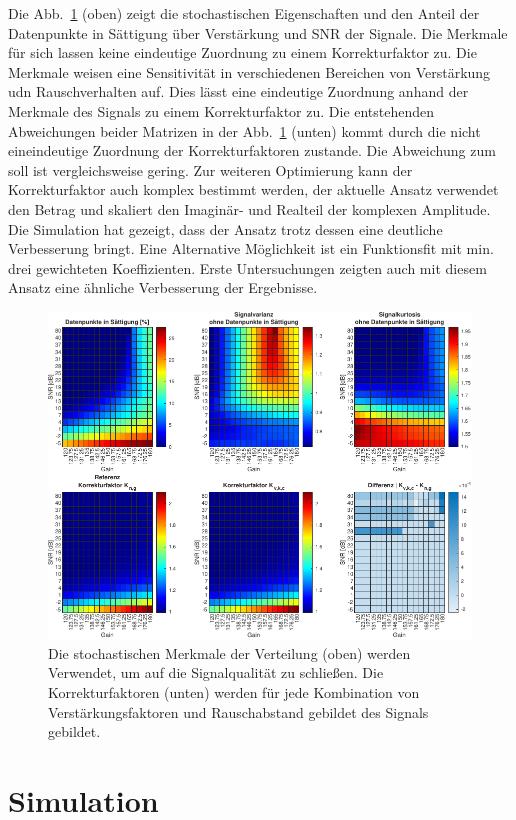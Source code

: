 Die Abb.~\ref{fig:lut} (oben) zeigt die stochastischen Eigenschaften und den Anteil der Datenpunkte in Sättigung über Verstärkung und SNR der Signale. Die Merkmale für sich lassen keine eindeutige Zuordnung zu einem Korrekturfaktor zu. Die Merkmale weisen eine Sensitivität in verschiedenen Bereichen von Verstärkung udn Rauschverhalten auf. Dies lässt eine eindeutige Zuordnung anhand der Merkmale des Signals zu einem Korrekturfaktor zu. Die entstehenden Abweichungen beider Matrizen in der Abb.~\ref{fig:lut} (unten) kommt durch die nicht eineindeutige Zuordnung der Korrekturfaktoren zustande. Die Abweichung zum soll ist vergleichsweise gering. Zur weiteren Optimierung kann der Korrekturfaktor auch komplex bestimmt werden, der aktuelle Ansatz verwendet den Betrag und skaliert den Imaginär- und Realteil der komplexen Amplitude. Die Simulation hat gezeigt, dass der Ansatz trotz dessen eine deutliche Verbesserung bringt. Eine Alternative Möglichkeit ist ein Funktionsfit mit min. drei gewichteten Koeffizienten. Erste Untersuchungen zeigten auch mit diesem Ansatz eine ähnliche Verbesserung der Ergebnisse.


\begin{figure}[th!]
	\centering
	\includegraphics[width=.9\textwidth]{../img/lut.pdf}
	\caption{Die stochastischen Merkmale der Verteilung (oben) werden Verwendet, um auf die Signalqualität zu schließen. Die Korrekturfaktoren (unten) werden für jede Kombination von Verstärkungsfaktoren und Rauschabstand gebildet des Signals gebildet.}
	\label{fig:lut} 
\end{figure}


\section{Simulation}

